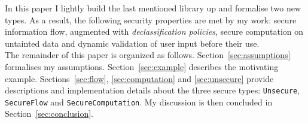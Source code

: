 In this paper I lightly build the last mentioned library up and formalise two new types. As a result, the following security properties are met by my work: secure information flow, augmented with \textit{declassification policies}, secure computation on untainted data and dynamic validation of user input before their use. \\
The remainder of this paper is organized as follows. Section~\ref{sec:assumptions} formalises my assumptions. Section~\ref{sec:example} describes the motivating example. Sections~\ref{sec:flow}, \ref{sec:computation} and \ref{sec:unsecure} provide descriptions and implementation details about the three secure types: \texttt{Unsecure}, \texttt{SecureFlow} and \texttt{SecureComputation}. My discussion is then concluded in Section~\ref{sec:conclusion}.